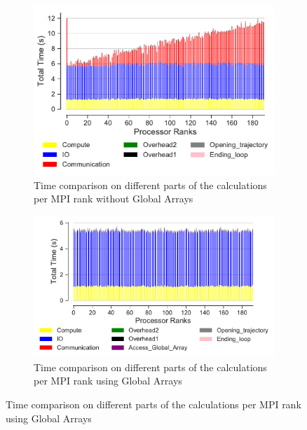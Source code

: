 \begin{figure}[ht!]
\begin{subfigure} {.45\textwidth}
  \includegraphics[width=\linewidth]{figures/split-BarPlot-rank-comparison_192_5.pdf}
   \caption{Time comparison on different parts of the calculations per MPI rank without Global Arrays}
  \label{fig:MPIranks-split}
\end{subfigure}
\hfill
\begin{subfigure} {.45\textwidth}
  \includegraphics[width=\linewidth]{figures/split-ga-BarPlot-rank-comparison_192_5.pdf}
  \caption{Time comparison on different parts of the calculations per MPI rank using Global Arrays}
  \label{fig:MPIranks-split-ga}
\end{subfigure}


\end{figure}
